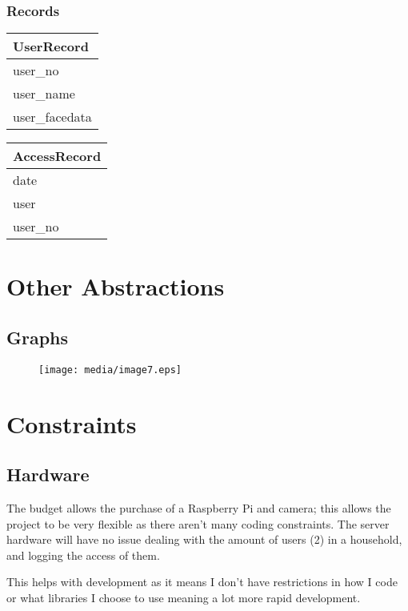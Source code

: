 \documentclass[12pt,a4paper]{report}
\begin{document}
\subsubsection{Records}\label{section:_Toc370402521}


\begin{tabular}{|l|}
\hline
\textbf{UserRecord} \\
\hline
user\_no \\
\hline
user\_name \\
\hline
user\_facedata \\
\hline
\end{tabular}



\begin{tabular}{|l|}
\hline
\textbf{AccessRecord} \\
\hline
date \\
\hline
user \\
\hline
user\_no \\
\hline
\end{tabular}


\section{Other Abstractions}

\subsection{Graphs}\label{section:_Toc370402523}


\begin{figure}[h]
\texttt{[image: media/image7.eps]}
\end{figure}


\section{Constraints}\label{section:_Toc370402524}
\subsection{Hardware}\label{section:_Toc370402525}
The budget allows the purchase of a Raspberry Pi and camera; this allows 
the project to be very flexible as there aren't many coding constraints. 
The server hardware will have no issue dealing with the amount of users 
(2) in a household, and logging the access of them.

This helps with development as it means I don't have restrictions in how 
I code or what libraries I choose to use meaning a lot more rapid 
development.
\end{document}
